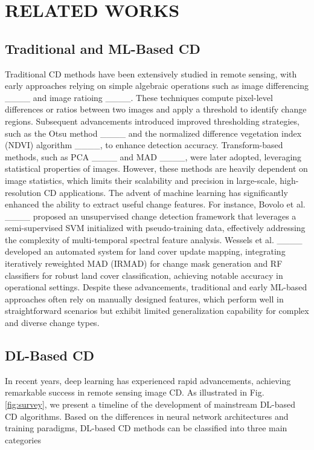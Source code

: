 \section{RELATED WORKS}
\label{B}
\subsection{Traditional and ML-Based CD}  

Traditional CD methods have been extensively studied in remote sensing, with early approaches relying on simple algebraic operations such as image differencing ____ and image ratioing ____. 
These techniques compute pixel-level differences or ratios between two images and apply a threshold to identify change regions. 
Subsequent advancements introduced improved thresholding strategies, such as the Otsu method ____ and the normalized difference vegetation index (NDVI) algorithm ____, to enhance detection accuracy. 
Transform-based methods, such as PCA ____ and MAD ____, were later adopted, leveraging statistical properties of images. 
However, these methods are heavily dependent on image statistics, which limits their scalability and precision in large-scale, high-resolution CD applications.  
The advent of machine learning has significantly enhanced the ability to extract useful change features. 
For instance, Bovolo et al. ____ proposed an unsupervised change detection framework that leverages a semi-supervised SVM initialized with pseudo-training data, effectively addressing the complexity of multi-temporal spectral feature analysis. 
Wessels et al. ____ developed an automated system for land cover update mapping, integrating iteratively reweighted MAD (IRMAD) for change mask generation and RF classifiers for robust land cover classification, achieving notable accuracy in operational settings.  
Despite these advancements, traditional and early ML-based approaches often rely on manually designed features, which perform well in straightforward scenarios but exhibit limited generalization capability for complex and diverse change types. 

\subsection{DL-Based CD}
In recent years, deep learning has experienced rapid advancements, achieving remarkable success in remote sensing image CD. 
As illustrated in Fig. \ref{fig:survey}, we present a timeline of the development of mainstream DL-based CD algorithms. 
Based on the differences in neural network architectures and training paradigms, DL-based CD methods can be classified into three main categories

